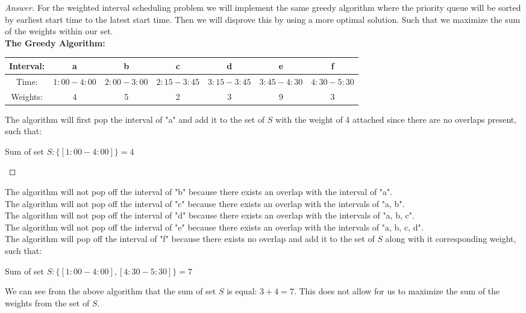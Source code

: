 \documentclass[11pt]{article}
\theoremstyle{definition}
\theoremstyle{definition}
\theoremstyle{definition}
\begin{document}
\begin{proof}[Answer]
For the weighted interval scheduling problem we will implement the same greedy algorithm where the priority queue will be sorted by earliest start time to the latest start time. Then we will disprove this by using a more optimal solution. Such that we maximize the sum of the weights within our set. \\
\textbf{The Greedy Algorithm:}\\
\begin{center}
\begin{tabular}{ | c | c | c | c | c | c | c | }
 \hline
 Interval:& a & b & c & d & e & f\\  
 \hline
 Time: & $1:00 - 4:00$ & $2:00 - 3:00$ & $2:15 - 3:45$ & $3:15 - 3:45$ & $3:45 - 4:30$ & $4:30 - 5:30$\\
  \hline
  Weights: & 4 & 5 & 2 & 3 & 9 & 3 \\
  \hline
\end{tabular}
\end{center}
The algorithm will first pop the interval of "a" and add it to the set of $S$ with the weight of 4 attached since there are no overlaps present, such that: \\
\begin{center}
Sum of set $S: \{[1:00 - 4: 00]\} = 4$\\
\end{center}
\end{proof}

The algorithm will not pop off the interval of "b" because there exists an overlap with the interval of "a". \\
The algorithm will not pop off the interval of "c" because there exists an overlap with the intervals of "a, b". \\
The algorithm will not pop off the interval of "d" because there exists an overlap with the intervals of "a, b, c". \\
The algorithm will not pop off the interval of "e" because there exists an overlap with the intervals of "a, b, c, d". \\

The algorithm will pop off the interval of "f" because there exists no overlap and add it to the set of $S$ along with it corresponding weight, such that: \\
\begin{center}
Sum of set $S: \{[1:00 - 4: 00], [4:30 - 5:30]\} = 7$\\
\end{center}
We can see from the above algorithm that the sum of set $S$ is equal: $3 + 4 = 7$. This does not allow for us to maximize the sum of the weights from the set of $S$. \\
\end{document}
